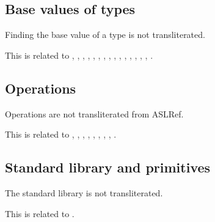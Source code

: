 \documentclass{book}
\begin{document}
\subsection{Base values of types}

Finding the base value of a type is not transliterated.

This is related to , , , ,
, , , , ,
, , , , ,
, .

\subsection{Operations}

Operations are not transliterated from ASLRef.

This is related to , , , ,
, , , , .

\subsection{Standard library and primitives}

The standard library is not transliterated.

This is related to .
\end{document}
